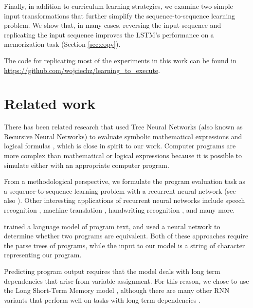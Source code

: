 Finally, in addition to curriculum learning strategies, we examine two simple input transformations that further simplify the sequence-to-sequence learning problem. We show that, in many cases, reversing the input sequence \citep{sutskever2014sequence} and replicating the input sequence improves the LSTM's performance on a memorization task (Section \ref{sec:copy}).

The code for replicating most of the experiments in this work can be found in
\url{https://github.com/wojciechz/learning_to_execute}.

\section{Related work}

There has been related research that used Tree Neural Networks (also known as Recursive Neural Networks) to evaluate symbolic mathematical expressions and logical formulas \citep{zaremba2014learning, bowman2014recursive, bowman2013can}, which is close in spirit to our work. Computer programs are more complex than mathematical or logical expressions because it is possible to simulate either with an appropriate computer program.

From a methodological perspective, we formulate the program evaluation task as a sequence-to-sequence learning problem with a recurrent neural network \citep{sutskever2014sequence} (see also \citep{mikolov2012statistical, sutskever2013training, pascanu2013construct}). Other interesting applications of recurrent neural networks include speech recognition \citep{robinson1996use, graves2013speech}, machine translation \citep{cho2014learning, sutskever2014sequence}, handwriting recognition \citep{pham2013dropout,zaremba2014recurrent}, and many more.

\cite{maddison2014structured} trained a language model of program text, and \cite{mou2014building} used a neural network to determine whether two programs are equivalent. Both of these approaches require the parse trees of programs, while the input to our model is a string of character representing our program.

Predicting program output requires that the model deals with long term dependencies that arise from variable assignment. For this reason, we chose to use the Long Short-Term Memory model \citep{hochreiter1997long}, although there are many other RNN variants that perform well on tasks with long term dependencies 
\citep{cho2014learning, jaeger2007optimization, koutnik2014clockwork, martens2010deep, bengio2013advances}. 

